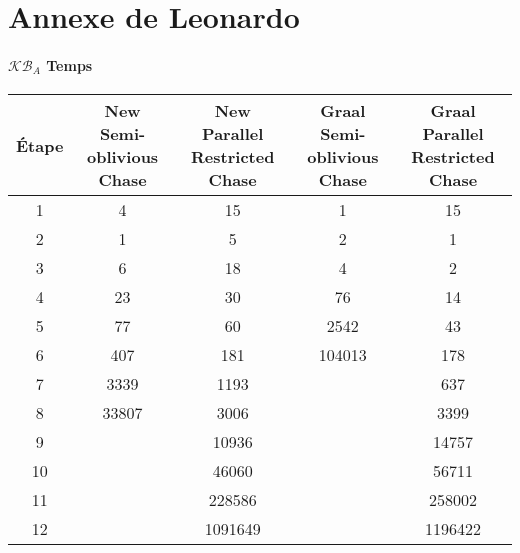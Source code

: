 \section{Annexe de Leonardo}
\paragraph{$\mathcal{KB}_A$ Temps}
\begin{center}
\begin{tabular}{|c||c|c|c|c|}
    \hline
    Étape & \shortstack{New \\ Semi-oblivious Chase} & \shortstack{New \\ Parallel Restricted Chase} & \shortstack{Graal \\ Semi-oblivious Chase} & \shortstack{Graal \\ Parallel Restricted Chase} \\
    \hline
     \hline
    1 & 4 & 15 & 1 & 15 \\ 
    \hline
    2 & 1 & 5 & 2 & 1 \\ 
    \hline
    3 & 6 & 18 & 4 & 2 \\ 
    \hline
    4 & 23 & 30 & 76 & 14 \\ 
     \hline
    5 & 77 & 60 & 2542 & 43 \\ 
    \hline
    6 & 407 & 181 & 104013 & 178 \\ 
    \hline
    7 & 3339 & 1193 &  & 637 \\ 
    \hline
    8 & 33807 & 3006 &  & 3399 \\ 
    \hline
    9 &  & 10936 &  & 14757 \\ 
    \hline
    10 &  & 46060 &  & 56711 \\ 
     \hline
    11 &  & 228586 &  & 258002 \\ 
    \hline
    12 &  & 1091649 &  & 1196422 \\ 
     \hline
\end{tabular}
\end{center}

